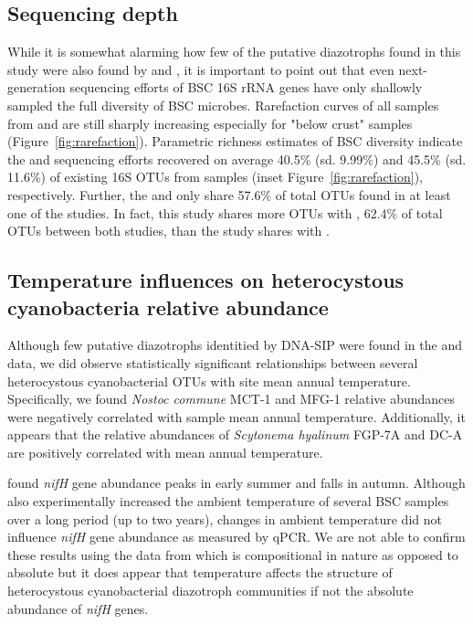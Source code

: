 \subsection{Sequencing depth}
While it is somewhat alarming how few of the putative diazotrophs found in this
study were also found by \citet{Garcia_Pichel_2013} and \citet{Steven_2013}, it
is important to point out that even next-generation sequencing efforts of BSC
16S rRNA genes have only shallowly sampled the full diversity of BSC microbes.
Rarefaction curves of all samples from \citet{Steven_2013} and
\citet{Garcia_Pichel_2013} are still sharply increasing especially for "below
crust" samples (Figure~\ref{fig:rarefaction}). Parametric richness estimates of
BSC diversity indicate the \citet{Steven_2013} and \citet{Garcia_Pichel_2013}
sequencing efforts recovered on average 40.5\% (sd. 9.99\%) and 45.5\% (sd.
11.6\%) of existing 16S OTUs from samples (inset Figure~\ref{fig:rarefaction}),
respectively. Further, the \citet{Steven_2013} and \citet{Garcia_Pichel_2013}
only share 57.6\% of total OTUs found in at least one of the studies. In fact,
this study shares more OTUs with \citet{Steven_2013}, 62.4\% of total OTUs
between both studies, than the \citet{Steven_2013} study shares with
\citet{Garcia_Pichel_2013}. 

\subsection{Temperature influences on heterocystous cyanobacteria relative abundance} 
Although few putative diazotrophs identitied by DNA-SIP were found
in the \citet{Garcia_Pichel_2013} and \citet{Steven_2013} data, we did observe
statistically significant relationships between several heterocystous
cyanobacterial OTUs with site mean annual temperature. Specifically, we found
\textit{Nostoc commune} MCT-1 and MFG-1 relative abundances were negatively
correlated with sample mean annual temperature. Additionally, it appears that
the relative abundances of \textit{Scytonema hyalinum} FGP-7A and DC-A are
positively correlated with mean annual temperature.

\citet{Yeager_2012} found \textit{nifH} gene abundance peaks in early summer
and falls in autumn. Although \citet{Yeager_2012} also experimentally
increased the ambient temperature of several BSC samples
over a long period (up to two years), changes in ambient temperature did not
influence \textit{nifH} gene abundance as measured by qPCR. We are not able to
confirm these results using the data from \citet{Garcia_Pichel_2013} which is
compositional in nature as opposed to absolute but it does appear that
temperature affects the structure of heterocystous cyanobacterial diazotroph
communities if not the absolute abundance of \textit{nifH} genes. 

